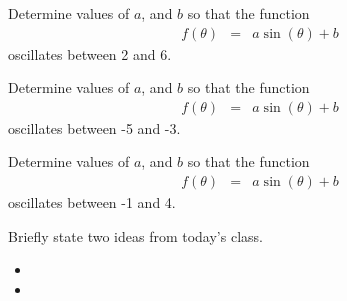 \begin{problem}
\begin{subproblem}
    \clearpage

  \item Determine values of $a$, and $b$ so that the function
    \begin{eqnarray*}
      f(\theta) & = & a\sin(\theta)+b
    \end{eqnarray*}
    oscillates between 2 and 6.
    \vfill

  \item Determine values of $a$, and $b$ so that the function
    \begin{eqnarray*}
      f(\theta) & = & a\sin(\theta)+b
    \end{eqnarray*}
    oscillates between -5 and -3.
    \vfill


  \item Determine values of $a$, and $b$ so that the function
    \begin{eqnarray*}
      f(\theta) & = & a\sin(\theta)+b
    \end{eqnarray*}
    oscillates between -1 and 4.
    \vfill
  \end{subproblem}

\end{problem}

\postClass

\begin{problem}
\item Briefly state two ideas from today's class.
  \begin{itemize}
  \item 
  \item 
  \end{itemize}
\item 
  \begin{subproblem}
    \item
  \end{subproblem}
\end{problem}



